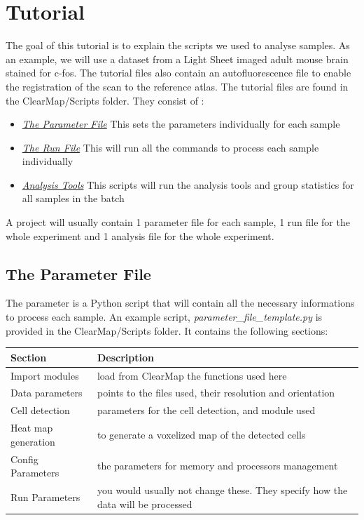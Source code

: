 \documentclass[letterpaper,10pt,english]{sphinxmanual}
\begin{document}
\section{Tutorial}
\label{tutorial::doc}\label{tutorial:tutorial}
The goal of this tutorial is to explain the scripts we used to analyse samples. As an example, we will use a dataset from a Light Sheet imaged adult mouse brain stained for c-fos. The tutorial files also contain an autofluorescence file to enable the registration of the scan to the reference atlas. The tutorial files are found in the ClearMap/Scripts folder. They consist of :
\begin{itemize}
\item {} 
{\hyperref[tutorial:the-parameter-file]{\emph{The Parameter File}}} This sets the parameters individually for each sample

\item {} 
{\hyperref[tutorial:the-run-file]{\emph{The Run File}}} This will run all the commands to process each sample individually

\item {} 
{\hyperref[tutorial:analysis-tools]{\emph{Analysis Tools}}} This scripts will run the analysis tools and group statistics for all samples in the batch

\end{itemize}

A project will usually contain 1 parameter file for each sample, 1 run file for the whole experiment and 1 analysis file for the whole experiment.


\subsection{The Parameter File}
\label{tutorial:the-parameter-file}
The parameter is a Python script that will contain all the necessary informations to process each sample. An example script, \emph{parameter\_file\_template.py} is provided in the ClearMap/Scripts folder. It contains the following sections:

\begin{tabulary}{\linewidth}{|L|L|}
\hline
\textsf{\relax 
Section
} & \textsf{\relax 
Description
}\\
\hline
Import modules
 & 
load from ClearMap the functions used here
\\
\hline
Data parameters
 & 
points to the files used, their resolution and orientation
\\
\hline
Cell detection
 & 
parameters for the cell detection, and module used
\\
\hline
Heat map generation
 & 
to generate a voxelized map of the detected cells
\\
\hline
Config Parameters
 & 
the parameters for memory and processors management
\\
\hline
Run Parameters
 & 
you would usually not change these. They specify how the data will be processed
\\
\hline\end{tabulary}
\end{document}
